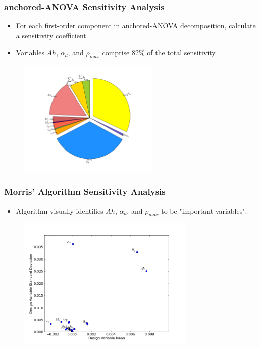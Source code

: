 \documentclass{beamer}
\begin{document}
\begin{frame}
\frametitle{anchored-ANOVA Sensitivity Analysis}

\begin{itemize}
  \item For each first-order component in anchored-ANOVA decomposition, calculate a sensitivity coefficient.
  \item Variables $Ah$, $\alpha_d$, and $\rho_{max}$ comprise 82\% of the total sensitivity. 
\end{itemize}

\begin{figure}
  \includegraphics[width=0.6\textwidth]{./pk_importance_pie.pdf}
\end{figure}

\end{frame}
\begin{frame}
\frametitle{Morris' Algorithm Sensitivity Analysis}

\begin{itemize}
  \item Algorithm visually identifies $Ah$, $\alpha_d$, and $\rho_{max}$ to be "important variables".
\end{itemize}

\begin{figure}
  \includegraphics[width=0.75\textwidth]{./importantvariables.png}
\end{figure}

\end{frame}
\end{document}
